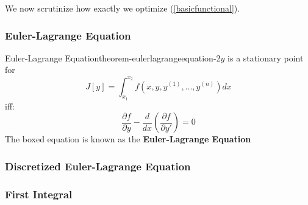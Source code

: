 We now scrutinize how exactly we optimize (\ref{basicfunctional}).

\subsubsection{Euler-Lagrange Equation}

\begin{mystthmtheorem}{Euler-Lagrange Equation}{theorem-eulerlagrangeequation-2}$y$ is a stationary point for
\begin{equation}
J[y] = \int_{x_1}^{x_2} f(x,y,y^{(1)},...,y^{(n)})dx
\end{equation}
iff:
\begin{equation}
\boxed{\frac{\partial f}{\partial y} -\frac{d}{dx}\left(\frac{\partial f}{\partial y'}\right)=0}
\end{equation}
The boxed equation is known as the \textbf{Euler-Lagrange Equation}

\end{mystthmtheorem}
\subsubsection{Discretized Euler-Lagrange Equation}

\subsubsection{First Integral}

